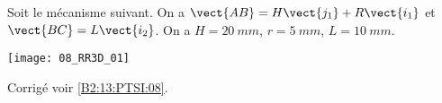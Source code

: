 \normalfalse \difficiletrue \tdifficilefalse
\correctionfalse


\setcounter{question}{0}
\ifcorrection
\else
{}
\fi

\ifprof
\else
Soit le mécanisme suivant. On a $\vect{AB}=H\vect{j_1}+R\vect{i_1}$ et $\vect{BC}=L\vect{i_2}$. On a $H=\SI{20}{mm}$, $r=\SI{5}{mm}$, $L=\SI{10}{mm}$. 
\begin{center}
\texttt{[image: 08\_RR3D\_01]}
\end{center}
\fi

\ifprof
\else
\fi



\ifprof
\else
\footnotesize

\normalsize
\begin{flushright}
\footnotesize{Corrigé  voir \ref{B2:13:PTSI:08}.}
\end{flushright}%
\fi